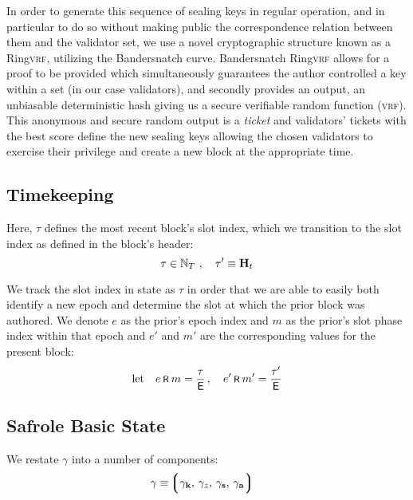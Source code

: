 In order to generate this sequence of sealing keys in regular operation, and in particular to do so without making public the correspondence relation between them and the validator set, we use a novel cryptographic structure known as a Ring\textsc{vrf}, utilizing the Bandersnatch curve. Bandersnatch Ring\textsc{vrf} allows for a proof to be provided which simultaneously guarantees the author controlled a key within a set (in our case validators), and secondly provides an output, an unbiasable deterministic hash giving us a secure verifiable random function (\textsc{vrf}). This anonymous and secure random output is a \emph{ticket} and validators' tickets with the best score define the new sealing keys allowing the chosen validators to exercise their privilege and create a new block at the appropriate time.






\subsection{Timekeeping}\label{sec:timekeeping}

Here, $\tau$ defines the most recent block's slot index, which we transition to the slot index as defined in the block's header:
\begin{equation}\label{eq:timeslotindex}
  \tau \in \mathbb{N}_T \ ,\quad
  \tau' \equiv \mathbf{H}_t
\end{equation}

We track the slot index in state as $\tau$ in order that we are able to easily both identify a new epoch and determine the slot at which the prior block was authored. We denote $e$ as the prior's epoch index and $m$ as the prior's slot phase index within that epoch and $e'$ and $m'$ are the corresponding values for the present block:
\begin{align}
  \mathrm{let}\quad e \text{\hspace{2pt}\footnotesize{\textsf{R}}\hspace{2pt}} m = \frac{\tau}{\mathsf{{}E}} \,,\quad
  e' \text{\hspace{2pt}\footnotesize{\textsf{R}}\hspace{2pt}} m' = \frac{\tau'}{\mathsf{{}E}}
\end{align}









\subsection{Safrole Basic State}\label{sec:safrolebasicstate}

We restate $\gamma$ into a number of components:
\begin{align}\label{eq:consensusstatecomposition}
  \gamma &\equiv \tuple{\gamma_\mathbf{k}\ts\gamma_z\ts\gamma_\mathbf{s}\ts\gamma_\mathbf{a}}
\end{align}

